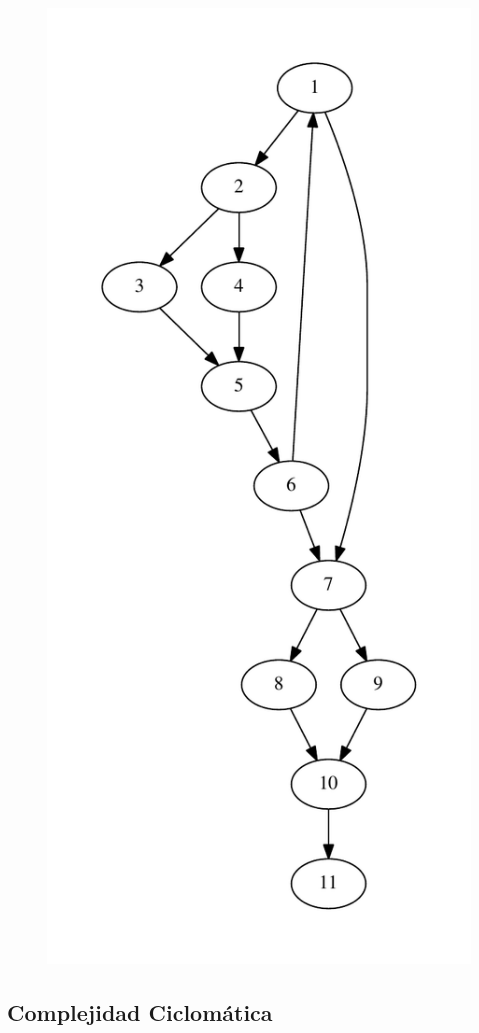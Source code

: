 \documentclass[a4paper,12pt]{article}
\begin{document}
\begin{figure}
 \centering
 \includegraphics[scale = 1]{graf2.pdf}
\end{figure}

\subsection{Complejidad Ciclomática}
\end{document}
